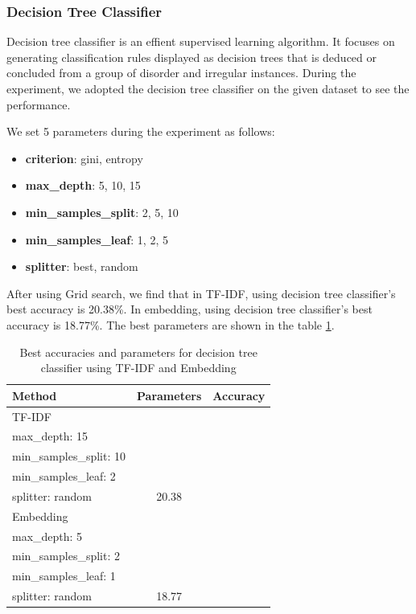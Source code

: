 \documentclass[11pt]{article}
\begin{document}
\subsubsection{Decision Tree Classifier}

Decision tree classifier is an effient supervised learning algorithm.
It focuses on generating classification rules displayed as decision trees that is deduced or concluded from a group of disorder and irregular instances. \cite{dt_8718711}
During the experiment, we adopted the decision tree classifier on the given dataset to see the performance.

We set 5 parameters during the experiment as follows:

\begin{itemize}
    \item \textbf{criterion}: gini, entropy
    \item \textbf{max\_depth}: 5, 10, 15
    \item \textbf{min\_samples\_split}: 2, 5, 10
    \item \textbf{min\_samples\_leaf}: 1, 2, 5
    \item \textbf{splitter}: best, random
\end{itemize}

After using Grid search, we find that in TF-IDF, using decision tree classifier's best accuracy is 20.38\%.
In embedding, using decision tree classifier's best accuracy is 18.77\%.
The best parameters are shown in the table \ref{tab:dt_results}.


\begin{table}[h]
    \centering
    \begin{tabularx}{0.5\textwidth}{@{}lcc@{}}
    \toprule
    Method     &  Parameters  & Accuracy \\ \midrule
    TF-IDF     & \begin{tabular}[t]{@{}l@{}}
                     criterion: gini \\
                     max\_depth: 15 \\
                     min\_samples\_split: 10 \\
                     min\_samples\_leaf: 2 \\
                     splitter: random
                   \end{tabular}  & 20.38 \\ \midrule
    Embedding  & \begin{tabular}[t]{@{}l@{}} 
                     criterion: entropy \\
                     max\_depth: 5 \\
                     min\_samples\_split: 2 \\
                     min\_samples\_leaf: 1 \\
                     splitter: random
                   \end{tabular} & 18.77  \\ \bottomrule
    \end{tabularx}
    \caption{Best accuracies and parameters for decision tree classifier using TF-IDF and Embedding}
    \label{tab:dt_results}
\end{table}
    
\end{document}
